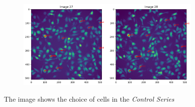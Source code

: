 \documentclass{article}
\begin{document}
\begin{figure}[h!]
\begin{subfigure}[b]{0.5\linewidth}
        \caption{}
    \end{subfigure}%
    \begin{subfigure}[b]{0.5\linewidth}
        \centering
        \includegraphics[width=\linewidth]{Report/RImages/Traces_Growth/trace-b28.png}
        \caption{}
    \end{subfigure}
    \caption{The image shows the choice of cells in the \emph{Control Series}}
    \label{fig:ChoiceofCells-ControlSeries}
\end{figure}






\end{document}
